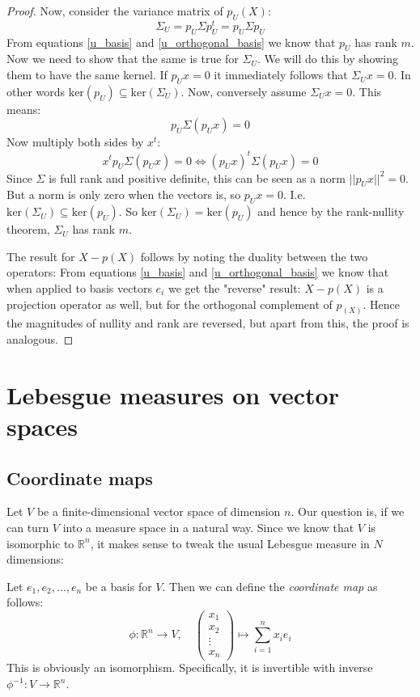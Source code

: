 \documentclass[12pt, a4paper]{article}
\numberwithin{equation}{section}
\begin{document}
\begin{proof}
Now, consider the variance matrix of $p_U(X)$:
\begin{equation}
\Sigma_U=p_U\Sigma p_U^t=p_U\Sigma p_U
\end{equation}
From equations \ref{u_basis} and \ref{u_orthogonal_basis} we know that $p_U$ has rank $m$. Now we need to show that the same is true for $\Sigma_U$. We will do this by showing them to have the same kernel. If $p_U x=0$ it immediately follows that $\Sigma_U x=0$. In other words $\textrm{ker}(p_U)\subseteq\textrm{ker}(\Sigma_U)$. Now, conversely assume $\Sigma_U x=0$. This means:
\begin{equation}
p_U\Sigma(p_U x)=0
\end{equation}
Now multiply both sides by $x^t$:
\begin{equation}
x^t p_U\Sigma(p_U x)=0\Leftrightarrow (p_U x)^t\Sigma(p_U x)=0
\end{equation}
Since $\Sigma$ is full rank and positive definite, this can be seen as a norm $||p_U x||^2=0$. But a norm is only zero when the vectors is, so $p_U x=0$. I.e. $\textrm{ker}(\Sigma_U)\subseteq\textrm{ker}(p_U)$. So $\textrm{ker}(\Sigma_U)=\textrm{ker}(p_U)$ and hence by the rank-nullity theorem, $\Sigma_U$ has rank $m$.

The result for $X-p(X)$ follows by noting the duality between the two operators: From equations \ref{u_basis} and \ref{u_orthogonal_basis} we know that when applied to basis vectors $e_i$ we get the "reverse" result: $X-p(X)$ is a projection operator as well, but for the orthogonal complement of $p_(X)$. Hence the magnitudes of nullity and rank are reversed, but apart from this, the proof is analogous.
\end{proof}

\section{Lebesgue measures on vector spaces}

\subsection{Coordinate maps}
Let $V$ be a finite-dimensional vector space of dimension $n$. Our question is, if we can turn $V$ into a measure space in a natural way. Since we know that $V$ is isomorphic to $\mathbb{R}^n$, it makes sense to tweak the usual Lebesgue measure in $N$ dimensions:

Let $e_1,e_2,\ldots,e_n$ be a basis for $V$. Then we can define the \textit{coordinate map} as follows:
\begin{equation}
\phi:\mathbb{R}^n\rightarrow V,\quad
\begin{pmatrix}
x_1	\\	x_2	\\ \vdots	\\ x_n
\end{pmatrix}
\mapsto\sum_{i=1}^n x_i e_i
\end{equation}
This is obviously an isomorphism. Specifically, it is invertible with inverse $\phi^{-1}: V\rightarrow\mathbb{R}^n$.
\end{document}

